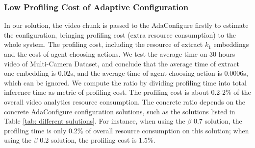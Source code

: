 
 
 
\subsubsection{Low Profiling Cost of Adaptive Configuration}
\label{subsec: profiling cost}
In our solution, the video chunk is passed to the AdaConfigure firstly to estimate the configuration, bringing profiling cost (extra resource consumption) to the whole system. 
The profiling cost, including the resource of extract $k_1$ embeddings and the cost of agent choosing actions. We test the average time on 30 hours video of Multi-Camera Dataset, and conclude that the average time of extract one embedding is 0.02s, and the average time of agent choosing action is 0.0006s, which can be ignored. We compute the ratio by dividing profiling time into total inference time as metric of profiling cost.
The profiling cost is about 0.2-2\% of the overall video analytics resource consumption. The concrete ratio depends on the concrete AdaConfigure configuration solutions, such as the solutions listed in Table \ref{tab: different sulutions}. For instance, when using the $\beta$ 0.7 solution, the profiling time is only 0.2\% of overall resource consumption on this solution; when using the $\beta$ 0.2 solution, the profiling cost is 1.5\%.        

